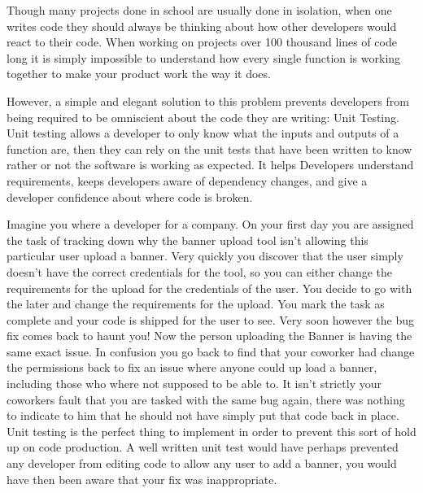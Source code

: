 

Though many projects done in school are usually done in isolation, when one writes code they should always be thinking about how other developers would react to their code.
When working on projects over 100 thousand lines of code long it is simply impossible to understand how every single function is working together to make your product work the way it does.

However, a simple and elegant solution to this problem prevents developers from being required to be omniscient about the code they are writing: Unit Testing.
Unit testing allows a developer to only know what the inputs and outputs of a function are, then they can rely on the unit tests that have been written to know rather or not the software is working as expected.
It helps Developers understand requirements, keeps developers aware of dependency changes, and give a developer confidence about where code is broken.

Imagine you where a developer for a company. On your first day you are assigned the task of tracking down why the banner upload tool isn't allowing this particular user upload a banner.
Very quickly you discover that the user simply doesn't have the correct credentials for the tool, so you can either change the requirements for the upload for the credentials of the user.
You decide to go with the later and change the requirements for the upload. You mark the task as complete and your code is shipped for the user to see.
Very soon however the bug fix comes back to haunt you! Now the person uploading the Banner is having the same exact issue.
In confusion you go back to find that your coworker had change the permissions back to fix an issue where anyone could up load a banner, including those who where not supposed to be able to.
It isn't strictly your coworkers fault that you are tasked with the same bug again, there was nothing to indicate to him that he should not have simply put that code back in place.
Unit testing is the perfect thing to implement in order to prevent this sort of hold up on code production.
A well written unit test would have perhaps prevented any developer from editing code to allow any user to add a banner, you would have then been aware that your fix was inappropriate.

